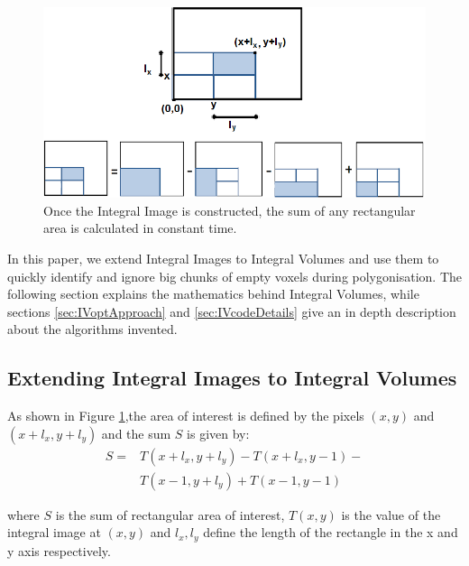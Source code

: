 \documentclass{subfiles}
\begin{document}
\begin{figure}[!htbp]
	\centering
	\includegraphics[width=5.5in]{img/IntegralImages}
	\caption[Integral Image]{Once the Integral Image is constructed, the sum of any rectangular area is calculated in constant time.}
	\label{fig:IntegralImages}
\end{figure}


In this paper, we extend Integral Images to Integral Volumes and use them to quickly identify and ignore big chunks of empty voxels during polygonisation. The following section explains the mathematics behind Integral Volumes, while sections \ref{sec:IVoptApproach}  and \ref{sec:IVcodeDetails} give an in depth description about the algorithms invented. 

\subsection{Extending Integral Images to Integral Volumes}\label{sec:extendingIV}

As shown in Figure \ref{fig:IntegralImages},the area of interest is defined by the pixels $(x, y)$ and $(x+l_x, y+l_y)$ and the sum $S$ is given by: 
\begin{equation}
\begin{split}
S = & T(x+l_x,y+l_y) - 
T(x+l_x,y-1)- \\
&  T(x-1,y+l_y) +
T(x-1,y-1)
\end{split}
\label{eq:IntegralImage}
\end{equation}

where 	$S$ is the sum of rectangular area of interest, $T(x, y)$ is the value of the integral image at $(x, y)$ and $l_x, l_y$ define the length of the rectangle in the x and y axis respectively. 
\end{document}
